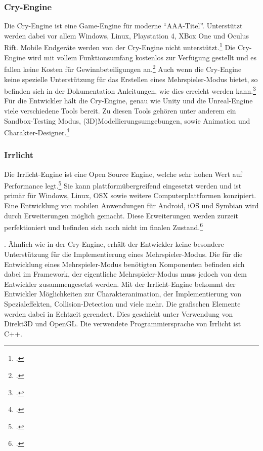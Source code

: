 	\subsubsection*{Cry-Engine}
	Die Cry-Engine ist eine Game-Engine für moderne \enquote{AAA-Titel}. Unterstützt werden dabei vor allem Windows, Linux, Playstation 4, XBox One und Oculus Rift. Mobile Endgeräte werden von der Cry-Engine nicht unterstützt.\footcite[\url{https://www.cryengine.com/features/platforms}]{cry-home} Die Cry-Engine wird mit vollem Funktionsumfang kostenlos zur Verfügung gestellt und es fallen keine Kosten für Gewinnbeteiligungen an.\footcite[\url{https://www.cryengine.com/features}]{cry-home} Auch wenn die Cry-Engine keine spezielle Unterstützung für das Erstellen eines Mehrspieler-Modus bietet, so befinden sich in der Dokumentation Anleitungen, wie dies erreicht werden kann.\footcite[\url{http://docs.cryengine.com/display/SDKDOC2/Multiplayer}]{cry-home} Für die Entwickler hält die Cry-Engine, genau wie Unity und die Unreal-Engine viele verschiedene Tools bereit. Zu diesen Tools gehören unter anderem ein Sandbox-Testing Modus, (3D)Modellierungsumgebungen, sowie Animation und Charakter-Designer.\footcite[\url{https://www.cryengine.com/features}]{cry-home}

	\subsubsection*{Irrlicht}
	Die Irrlicht-Engine ist eine Open Source Engine, welche sehr hohen Wert auf Performance legt.\footcite{irrlicht-home} Sie kann plattformübergreifend eingesetzt werden und ist primär für Windows, Linux, OSX sowie weitere Computerplattformen konzipiert. Eine Entwicklung von mobilen Anwendungen für Android, iOS und Symbian wird durch Erweiterungen möglich gemacht. Diese Erweiterungen werden zurzeit perfektioniert und befinden sich noch nicht im finalen Zustand.\footcite[\url{http://irrlicht.sourceforge.net/?page\_id=45}]{irrlicht-home}. Ähnlich wie in der Cry-Engine, erhält der Entwickler keine besondere Unterstützung für die Implementierung eines Mehrspieler-Modus. Die für die Entwicklung eines Mehrspieler-Modus benötigten Komponenten befinden sich dabei im Framework, der eigentliche Mehrspieler-Modus muss jedoch von dem Entwickler zusammengesetzt werden.\footnotemark{} Mit der Irrlicht-Engine bekommt der Entwickler Möglichkeiten zur Charakteranimation, der Implementierung von Spezialeffekten, Collision-Detection und viele mehr. Die grafischen Elemente werden dabei in Echtzeit gerendert. Dies geschieht unter Verwendung von Direkt3D und OpenGL. Die verwendete Programmiersprache von Irrlicht ist C++.\footnotemark{}


